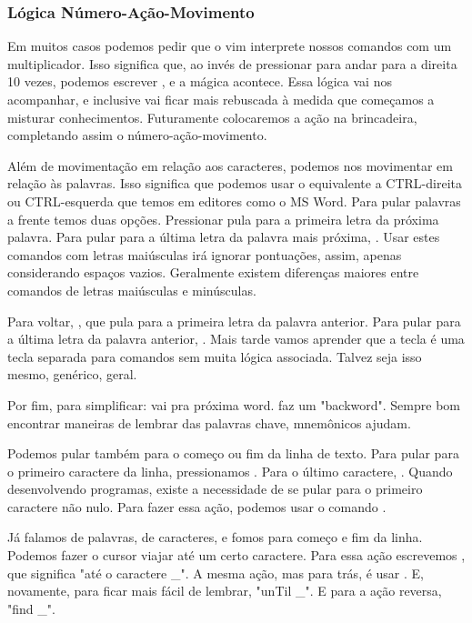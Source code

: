 \subsubsection{Lógica Número-Ação-Movimento}
Em muitos casos podemos pedir que o vim interprete nossos comandos com um multiplicador.
Isso significa que, ao invés de pressionar  para andar para a direita 10 vezes,
podemos escrever , e a mágica acontece.
Essa lógica vai nos acompanhar, e inclusive vai ficar mais rebuscada à medida que começamos a misturar conhecimentos.
Futuramente colocaremos a ação na brincadeira, completando assim o número-ação-movimento.


Além de movimentação em relação aos caracteres, podemos nos movimentar em relação às palavras.
Isso significa que podemos usar o equivalente a CTRL-direita ou CTRL-esquerda que temos em editores como o MS Word.
Para pular palavras a frente temos duas opções.
Pressionar  pula para a primeira letra da próxima palavra.
Para pular para a última letra da palavra mais próxima, .
Usar estes comandos com letras maiúsculas irá ignorar pontuações, assim, apenas considerando espaços vazios.
Geralmente existem diferenças maiores entre comandos de letras maiúsculas e minúsculas.

Para voltar, , que pula para a primeira letra da palavra anterior.
Para pular para a última letra da palavra anterior, .
Mais tarde vamos aprender que a tecla  é uma tecla separada para comandos sem muita lógica associada.
Talvez seja isso mesmo, genérico, geral.

Por fim, para simplificar:  vai pra próxima word.  faz um "backword".
Sempre bom encontrar maneiras de lembrar das palavras chave, mnemônicos ajudam.


Podemos pular também para o começo ou fim da linha de texto.
Para pular para o primeiro caractere da linha, pressionamos .
Para o último caractere, \vimcommand{\$}.
Quando desenvolvendo programas, existe a necessidade de se pular para o primeiro caractere não nulo.
Para fazer essa ação, podemos usar o comando \vimcommand{\^}.

Já falamos de palavras, de caracteres, e fomos para começo e fim da linha.
Podemos fazer o cursor viajar até um certo caractere.
Para essa ação escrevemos , que significa "até o caractere \_".
A mesma ação, mas para trás, é usar .
E, novamente, para ficar mais fácil de lembrar, "unTil \_".
E para a ação reversa, "find \_".

